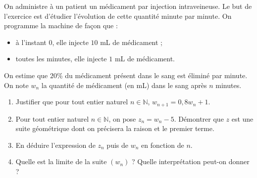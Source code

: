 \documentclass[11pt]{article}
\begin{document}
\begin{exo}
  On administre à un patient un médicament par injection intraveineuse. Le but
  de l'exercice est d'étudier l'évolution de cette quantité minute par minute.
  On programme la machine de façon que :
  \begin{itemize}
    \item à l'instant $0$, elle injecte $10$ mL de médicament ;
    \item toutes les minutes, elle injecte $1$ mL de médicament.
  \end{itemize}
  On estime que $20$\% du médicament présent dans le sang est éliminé par
  minute. On note $w_n$ la quantité de médicament (en mL) dans le sang après $n$
  minutes.
  \begin{enumerate}
    \item Justifier que pour tout entier naturel $n\in\mathbb{N}$, $w_{n+1} =
      0,8w_n+1$.
    \item Pour tout entier naturel $n\in\mathbb{N}$, on pose $z_n=w_n-5$.
      Démontrer que $z$ est une suite géométrique dont on précisera la raison et
      le premier terme.
    \item En déduire l'expression de $z_n$ puis de $w_n$ en fonction de $n$.
    \item Quelle est la limite de la suite $\left( w_n \right)$ ? Quelle
      interprétation peut-on donner ?
  \end{enumerate}
\end{exo}
\end{document}
